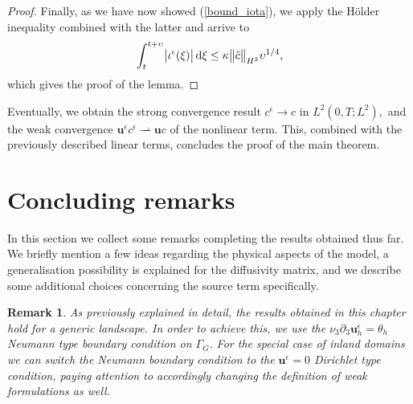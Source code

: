 \documentclass[12pt]{report}
\numberwithin{theorem}{chapter}
\numberwithin{corollary}{chapter}
\numberwithin{lemma}{chapter}
\newtheorem{remark}{Remark}
\numberwithin{remark}{chapter}
\numberwithin{definition}{chapter}
\numberwithin{prop}{chapter}
\newcommand*\diff{\mathop{}\!\mathrm{d}}
\begin{document}
\begin{proof}
Finally, as we have now showed (\ref{bound_iota}), we apply the H\"older inequality combined with the latter and arrive to
\[ \int_t^{t+\upsilon} \abs{\iota^\epsilon (\xi)} \diff \xi \leq \kappa \big \| \tilde{c} \big \| _{H^2} \upsilon^{1/4},\]
%
which gives the proof of the lemma.

\end{proof}
   
Eventually, we obtain the strong convergence result $c^\epsilon \to c$ in $L^2(0,T; L^2),$ and the weak convergence $\mathbf{u}^\epsilon c^\epsilon \rightharpoonup \mathbf{u} c$ of the nonlinear term. This, combined with the previously described linear terms, concludes the proof of the main theorem.

\section{Concluding remarks} \label{concludingremarks}

In this section we collect some remarks completing the results obtained thus far. We briefly mention a few ideas regarding the physical aspects of the model, a generalisation possibility is explained for the diffusivity matrix, and we describe some additional choices concerning the source term specifically.

\begin{remark}
\normalfont
As previously explained in detail, the results obtained in this chapter hold for a generic landscape. In order to achieve this, we use the $\nu_3 \partial_3 \mathbf{u}_h^\epsilon = \theta_h$ Neumann type boundary condition on $\Gamma_G.$ For the special case of inland domains we can switch the Neumann boundary condition to the $\mathbf{u}^\epsilon = 0$ Dirichlet type condition, paying attention to accordingly changing the definition of weak formulations as well.
\end{remark}
\end{document}

